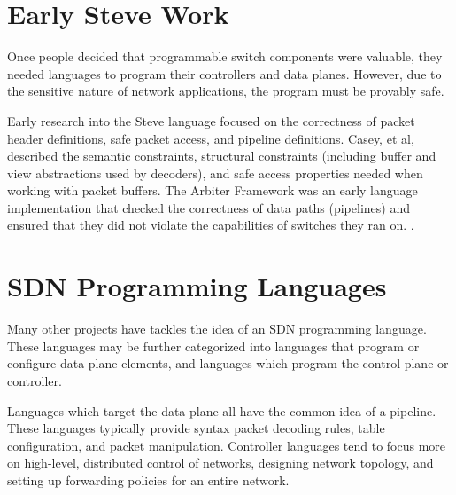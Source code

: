 

\section{Early Steve Work}

Once people decided that programmable switch components were valuable,
they needed languages to program their controllers and data planes.
However, due to the sensitive nature of network applications, the program must be provably safe.

Early research into the Steve language focused on the correctness of packet
header definitions, safe packet access, and pipeline definitions.
Casey, et al, described the semantic constraints,
structural constraints (including buffer and view abstractions used by decoders), and 
safe access properties needed when working with packet buffers.
The Arbiter Framework was an early language implementation that checked the correctness of data paths (pipelines) and ensured that they did not violate the 
capabilities of switches they ran on.
\cite{arbiter}.

\section{SDN Programming Languages}

Many other projects have tackles the idea of an SDN programming language.
These languages may be further categorized into languages that program or configure
data plane elements, and languages which program the control plane or controller.

Languages which target the data plane all have the common idea of a pipeline.
These languages typically provide syntax packet decoding rules, table configuration,
and packet manipulation.
Controller languages tend to focus more on high-level, distributed control
of networks, designing network topology, and setting up forwarding policies
for an entire network.

